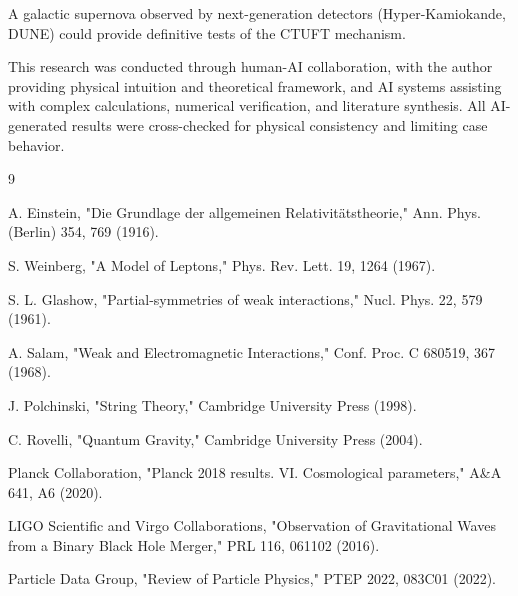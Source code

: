 \documentclass[aps,prd,reprint,superscriptaddress,amsmath,amssymb]{revtex4-2}
\begin{document}
A galactic supernova observed by next-generation detectors (Hyper-Kamiokande, DUNE) could provide definitive tests of the CTUFT mechanism.

\begin{acknowledgments}
This research was conducted through human-AI collaboration, with the author providing physical intuition and theoretical framework, and AI systems assisting with complex calculations, numerical verification, and literature synthesis. All AI-generated results were cross-checked for physical consistency and limiting case behavior.
\end{acknowledgments}

\begin{thebibliography}{9}

A. Einstein, "Die Grundlage der allgemeinen Relativitätstheorie," Ann. Phys. (Berlin) 354, 769 (1916).

S. Weinberg, "A Model of Leptons," Phys. Rev. Lett. 19, 1264 (1967).

S. L. Glashow, "Partial-symmetries of weak interactions," Nucl. Phys. 22, 579 (1961).

A. Salam, "Weak and Electromagnetic Interactions," Conf. Proc. C 680519, 367 (1968).

J. Polchinski, "String Theory," Cambridge University Press (1998).

C. Rovelli, "Quantum Gravity," Cambridge University Press (2004).

Planck Collaboration, "Planck 2018 results. VI. Cosmological parameters," A\&A 641, A6 (2020).

LIGO Scientific and Virgo Collaborations, "Observation of Gravitational Waves from a Binary Black Hole Merger," PRL 116, 061102 (2016).

Particle Data Group, "Review of Particle Physics," PTEP 2022, 083C01 (2022).

\end{thebibliography}
\end{document}
